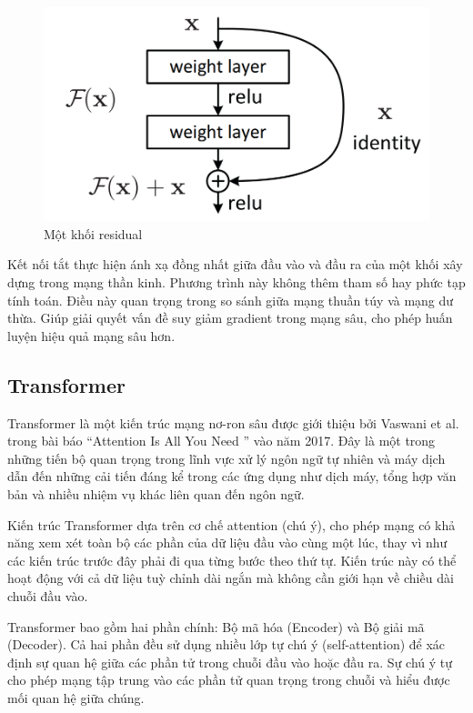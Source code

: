 \begin{figure}[h]
    \includegraphics[scale=0.3]{images/residual_block.png}
    \centering
    \caption{Một khối residual}
    \label{residual-block}
\end{figure}

Kết nối tắt thực hiện ánh xạ đồng nhất giữa đầu vào và đầu ra của một khối xây dựng trong mạng thần kinh. Phương trình này không thêm tham số hay phức tạp tính toán. Điều này quan trọng trong so sánh giữa mạng thuần túy và mạng dư thừa. Giúp giải quyết vấn đề suy giảm gradient trong mạng sâu, cho phép huấn luyện hiệu quả mạng sâu hơn.

\subsection{Transformer}
Transformer là một kiến trúc mạng nơ-ron sâu được giới thiệu bởi Vaswani et al. trong bài báo ``Attention Is All You Need \cite{vaswani2023attention}'' vào năm 2017. Đây là một trong những tiến bộ quan trọng trong lĩnh vực xử lý ngôn ngữ tự nhiên và máy dịch dẫn đến những cải tiến đáng kể trong các ứng dụng như dịch máy, tổng hợp văn bản và nhiều nhiệm vụ khác liên quan đến ngôn ngữ.

Kiến trúc Transformer dựa trên cơ chế attention (chú ý), cho phép mạng có khả năng xem xét toàn bộ các phần của dữ liệu đầu vào cùng một lúc, thay vì như các kiến trúc trước đây phải đi qua từng bước theo thứ tự. Kiến trúc này có thể hoạt động với cả dữ liệu tuỳ chỉnh dài ngắn mà không cần giới hạn về chiều dài chuỗi đầu vào.

Transformer bao gồm hai phần chính: Bộ mã hóa (Encoder) và Bộ giải mã (Decoder). Cả hai phần đều sử dụng nhiều lớp tự chú ý (self-attention) để xác định sự quan hệ giữa các phần tử trong chuỗi đầu vào hoặc đầu ra. Sự chú ý tự cho phép mạng tập trung vào các phần tử quan trọng trong chuỗi và hiểu được mối quan hệ giữa chúng.

